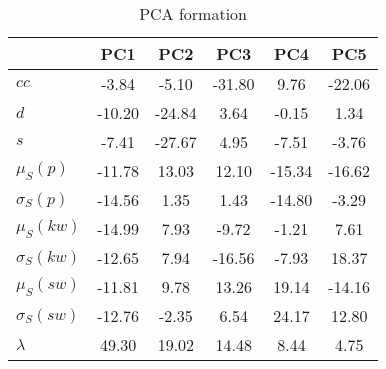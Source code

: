 \begin{table}[h!]
\begin{center}
\begin{tabular}{| l || c | c | c | c | c |}\hline
 & {\bf PC1} & {\bf PC2} & {\bf PC3} & {\bf PC4} & {\bf PC5} \\\hline\hline
{\bf $cc$} & -3.84 & -5.10 & -31.80 & 9.76 & -22.06 \\
{\bf $d$} & -10.20 & -24.84 & 3.64 & -0.15 & 1.34 \\
{\bf $s$} & -7.41 & -27.67 & 4.95 & -7.51 & -3.76 \\\hline
{\bf $\mu_S(p)$} & -11.78 & 13.03 & 12.10 & -15.34 & -16.62 \\
{\bf $\sigma_S(p)$} & -14.56 & 1.35 & 1.43 & -14.80 & -3.29 \\\hline
{\bf $\mu_S(kw)$} & -14.99 & 7.93 & -9.72 & -1.21 & 7.61 \\
{\bf $\sigma_S(kw)$} & -12.65 & 7.94 & -16.56 & -7.93 & 18.37 \\
{\bf $\mu_S(sw)$} & -11.81 & 9.78 & 13.26 & 19.14 & -14.16 \\\hline
{\bf $\sigma_S(sw)$} & -12.76 & -2.35 & 6.54 & 24.17 & 12.80 \\\hline\hline
{\bf $\lambda$} & 49.30 & 19.02 & 14.48 & 8.44 & 4.75 \\\hline
\end{tabular}
\caption{PCA formation}
\end{center}
\end{table}